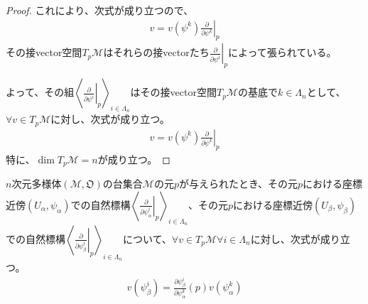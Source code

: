 \documentclass[dvipdfmx]{jsarticle}
\begin{document}
\begin{proof}
  これにより、次式が成り立つので、
  \begin{align*}
    v=v\left(\psi^k \right) \left. \frac{\partial }{\partial \psi^k } \right|_p 
  \end{align*}
  その接vector空間$T_p \mathcal{M}$はそれらの接vectorたち$\left. \frac{\partial }{\partial \psi^i } \right|_p $によって張られている。\par
  よって、その組$\left\langle \left. \frac{\partial}{\partial \psi^i }\right|_p \right\rangle_{i\in \varLambda_n} $はその接vector空間$T_p \mathcal{M}$の基底で$k\in \varLambda_n $として、$\forall v\in T_p \mathcal{M}$に対し、次式が成り立つ。
  \begin{align*}
    v=v\left(\psi^k \right) \left. \frac{\partial }{\partial \psi^k } \right|_p 
  \end{align*}
  特に、$\dim T_p \mathcal{M} =n$が成り立つ。
\end{proof}
\begin{thm}\label{8.3.3.11}
  $n$次元多様体$\left(\mathcal{M},\mathfrak{O}\right)$の台集合$\mathcal{M}$の元$p$が与えられたとき、その元$p$における座標近傍$\left(U_\alpha,\psi_\alpha \right)$での自然標構$\left\langle \left. \frac{\partial}{\partial \psi^i_\alpha }\right|_p \right\rangle_{i\in \varLambda_n} $、その元$p$における座標近傍$\left(U_\beta ,\psi_\beta \right)$での自然標構$\left\langle \left. \frac{\partial}{\partial \psi^i_\beta }\right|_p \right\rangle_{i\in \varLambda_n} $について、$\forall v\in T_p \mathcal{M} \forall i\in \varLambda_n $に対し、次式が成り立つ。
  \begin{align*}
    v\left( \psi^i_\beta \right)=\frac{\partial \psi^i_\beta }{\partial \psi^k_\alpha } \left(p\right) v\left(\psi^k_\alpha \right) 
  \end{align*}
\end{thm}
\end{document}
